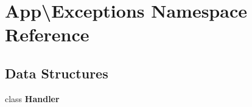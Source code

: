 \section{App\textbackslash{}Exceptions Namespace Reference}
\label{namespace_app_1_1_exceptions}
\subsection*{Data Structures}
\begin{DoxyCompactItemize}
\item 
class {\bf Handler}
\end{DoxyCompactItemize}
